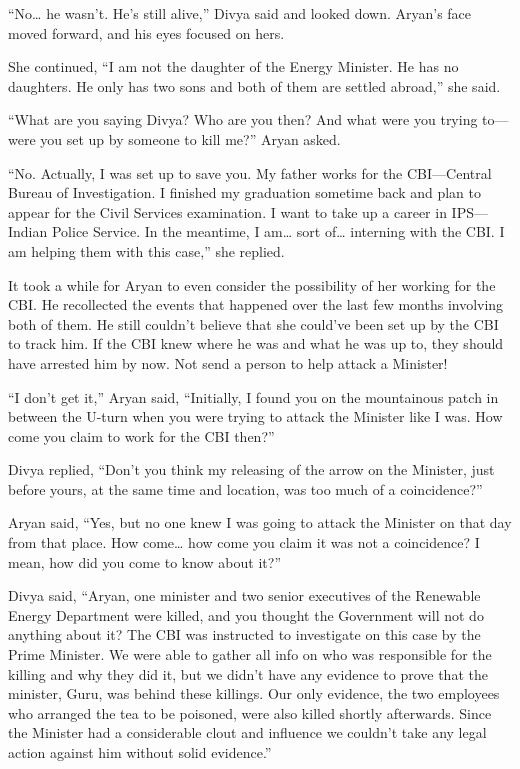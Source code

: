 “No… he wasn't. He's still alive,” Divya said and looked down. Aryan's face
moved forward, and his eyes focused on hers.

She continued, “I am not the daughter of the Energy Minister. He has no
daughters. He only has two sons and both of them are settled abroad,” she said.

“What are you saying Divya? Who are you then? And what were you trying to—were
you set up by someone to kill me?” Aryan asked.

“No. Actually, I was set up to save you. My father works for the CBI—Central
Bureau of Investigation. I finished my graduation sometime back and plan to
appear for the Civil Services examination. I want to take up a career in
IPS—Indian Police Service. In the meantime, I am… sort of… interning with
the CBI. I am helping them with this case,” she replied.

It took a while for Aryan to even consider the possibility of her working for
the CBI. He recollected the events that happened over the last few months
involving both of them. He still couldn't believe that she could've been set up
by the CBI to track him. If the CBI knew where he was and what he was up to,
they should have arrested him by now. Not send a person to help attack a
Minister!

“I don't get it,” Aryan said, “Initially, I found you on the mountainous patch
in between the U-turn when you were trying to attack the Minister like I was.
How come you claim to work for the CBI then?”

Divya replied, “Don't you think my releasing of the arrow on the Minister, just
before yours, at the same time and location, was too much of a coincidence?”

Aryan said, “Yes, but no one knew I was going to attack the Minister on that day
from that place. How come… how come you claim it was not a coincidence? I
mean, how did you come to know about it?”

Divya said, “Aryan, one minister and two senior executives of the Renewable
Energy Department were killed, and you thought the Government will not do
anything about it? The CBI was instructed to investigate on this case by the
Prime Minister. We were able to gather all info on who was responsible for the
killing and why they did it, but we didn't have any evidence to prove that the
minister, Guru, was behind these killings. Our only evidence, the two employees
who arranged the tea to be poisoned, were also killed shortly afterwards. Since
the Minister had a considerable clout and influence we couldn't take any legal
action against him without solid evidence.”

